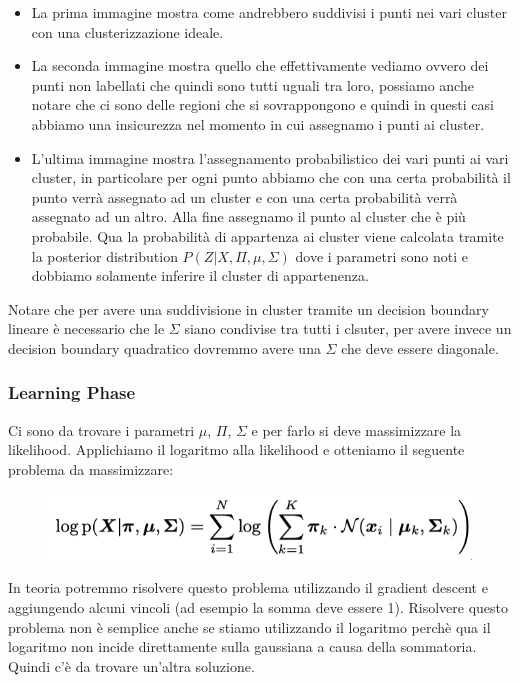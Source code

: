 \documentclass[14pt]{extreport}
\begin{document}
\begin{itemize}
\item La prima immagine mostra come andrebbero suddivisi i punti nei vari cluster con una clusterizzazione ideale.
\item La seconda immagine mostra quello che effettivamente vediamo ovvero dei punti non labellati che quindi sono tutti uguali tra loro, possiamo
anche notare che ci sono delle regioni che si sovrappongono e quindi in questi casi abbiamo una insicurezza nel momento in cui assegnamo i punti ai cluster.
\item L'ultima immagine mostra l'assegnamento probabilistico dei vari punti ai vari cluster, in particolare per ogni punto abbiamo che con una certa probabilità
il punto verrà assegnato ad un cluster e con una certa probabilità verrà assegnato ad un altro. Alla fine assegnamo il punto al cluster che è più probabile.
Qua la probabilità di appartenza ai cluster viene calcolata tramite la posterior distribution $P(Z|X,\Pi, \mu, \Sigma)$ dove i parametri sono noti e dobbiamo
solamente inferire il cluster di appartenenza.
\end{itemize}



Notare che per avere una suddivisione in cluster tramite un decision boundary lineare è necessario che le $\Sigma$ siano condivise tra tutti i clsuter, per avere invece un 
decision boundary quadratico dovremmo avere una $\Sigma$ che deve essere diagonale.

\subsubsection{Learning Phase}

Ci sono da trovare i parametri $\mu$, $\Pi$, $\Sigma$ e per farlo si deve massimizzare la likelihood.
Applichiamo il logaritmo alla likelihood e otteniamo il seguente problema da massimizzare:


\begin{figure}[H] 
\centering
\includegraphics[width=0.7\linewidth]{548.jpeg}
\end{figure}

In teoria potremmo risolvere questo problema utilizzando il gradient descent e aggiungendo alcuni vincoli (ad esempio la somma deve essere 1).
Risolvere questo problema non è semplice anche se stiamo utilizzando il logaritmo perchè qua il logaritmo non incide direttamente sulla gaussiana a causa 
della sommatoria. Quindi c'è da trovare un'altra soluzione.
\end{document}
